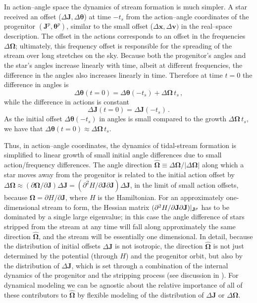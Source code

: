 \documentclass[12pt,preprint]{aastex}
\renewcommand{\vec}[1]{\ensuremath{\mathbf{#1}}}
\newcommand{\unitvec}[1]{\ensuremath{\mathbf{\hat{#1}}}}
\newcommand{\vecx}{\ensuremath{\vec{x}}}
\newcommand{\vecv}{\ensuremath{\vec{v}}}
\newcommand{\vecj}{\ensuremath{\vec{J}}}
\newcommand{\veco}{\ensuremath{\vec{\Omega}}}
\newcommand{\veca}{\ensuremath{\boldsymbol\theta}}
\newcommand{\ts}{\ensuremath{t_s}}
\begin{document}
In action--angle space the dynamics of stream formation is much
simpler. A star received an offset ($\Delta \vecj,\Delta \veca$) at
time $-\ts$ from the action--angle coordinates of the progenitor
$(\vecj^p,\veca^p)$, similar to the small offset ($\Delta \vecx,\Delta
\vecv)$ in the real--space description. The offset in the actions
corresponds to an offset in the frequencies $\Delta \veco$;
ultimately, this frequency offset is responsible for the spreading of
the stream over long stretches on the sky. Because both the
progenitor's angles and the star's angles increase linearly with time,
albeit at different frequencies, the difference in the angles also
increases linearly in time. Therefore at time $t=0$ the difference in
angles is
\begin{equation}
\Delta \veca(t=0) = \Delta \veca(-\ts) + \Delta \veco \,\ts\,,
\end{equation}
while the difference in actions is constant
\begin{equation}
\Delta \vecj(t=0) = \Delta \vecj(-\ts)\,.
\end{equation}
As the initial offset $\Delta \veca(-\ts)$ in angles is small compared
to the growth $\Delta \veco \,\ts$, we have that $\Delta \veca(t=0)
\approx \Delta \veco \,\ts$.

Thus, in action--angle coordinates, the dynamics of tidal-stream
formation is simplified to linear growth of small initial angle
differences due to small action/frequency differences. The angle
direction $\unitvec{\veco} \equiv \Delta \veco / | \Delta \veco|$
along which a star moves away from the progenitor is related to the
initial action offset by $\Delta \veco \approx (\partial \veco /
\partial \vecj) \Delta \vecj = (\partial^2 H / \partial \vecj \partial
\vecj) \Delta \vecj$, in the limit of small action offsets, because
$\veco = \partial H / \partial \vecj$, where $H$ is the
Hamiltonian. For an approximately one-dimensional stream to form, the
Hessian matrix $(\partial^2 H / \partial \vecj \partial
\vecj)\large|_{\vecj^p}$ has to be dominated by a single large
eigenvalue; in this case the angle difference of stars stripped from
the stream at any time will fall along approximately the same
direction $\unitvec\veco$, and the stream will be essentially one
dimensional. In detail, because the distribution of initial offsets
$\Delta \vecj$ is not isotropic, the direction $\unitvec \veco$ is not
just determined by the potential (through $H$) and the progenitor
orbit, but also by the distribution of $\Delta \vecj$, which is set
through a combination of the internal dynamics of the progenitor and
the stripping process (see discussion in \citealt{Sanders13b}). For
dynamical modeling we can be agnostic about the relative importance of
all of these contributors to $\unitvec \veco$ by flexible modeling of
the distribution of $\Delta \vecj$ or $\Delta \veco$.
\end{document}
